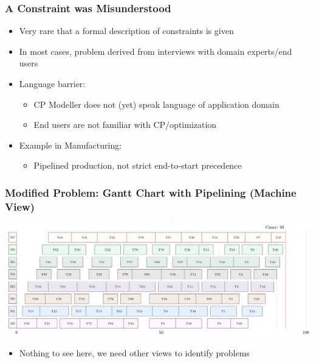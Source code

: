 
\begin{frame}
  \frametitle{A Constraint was Misunderstood}
  \begin{itemize}
  \item Very rare that a formal description of constraints is given
  \item In most cases, problem derived from interviews with domain experts/end users
  \item Language barrier: 
  \begin{itemize}
      \item CP Modeller does not (yet) speak language of application domain
      \item End users are not familiar with CP/optimization
  \end{itemize}
  \item Example in Manufacturing:
  \begin{itemize}
  \item Pipelined production, not strict end-to-start precedence
  \end{itemize}
  \end{itemize}
\end{frame}

\begin{frame}
  \frametitle{Modified Problem: Gantt Chart with Pipelining (Machine View)}
  \includegraphics[width=14cm]{images/pipelinemachineview}
  \begin{itemize}
      \item Nothing to see here, we need other views to identify problems
  \end{itemize}
\end{frame}

